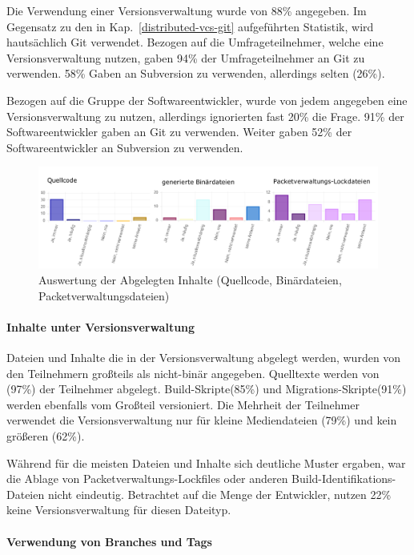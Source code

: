Die Verwendung einer Versionsverwaltung wurde von 88\% angegeben. Im Gegensatz zu den in  Kap.~\ref{distributed-vcs-git} aufgeführten Statistik, wird hautsächlich Git verwendet. Bezogen auf die Umfrageteilnehmer, welche eine Versionsverwaltung nutzen, gaben 94\% der Umfrageteilnehmer an Git zu verwenden. 58\% Gaben an Subversion zu verwenden, allerdings selten (26\%). 

Bezogen auf die Gruppe der Softwareentwickler, wurde von jedem angegeben eine Versionsverwaltung zu nutzen, allerdings ignorierten fast 20\% die Frage. 91\% der Softwareentwickler gaben an Git zu verwenden. Weiter gaben 52\% der Softwareentwickler an Subversion zu verwenden.

\begin{figure}[htbp]
  \includegraphics[width=\textwidth, height=\textheight, keepaspectratio]
    {resources/survey-vcs-content.pdf}
  \caption{Auswertung der Abgelegten Inhalte (Quellcode, Binärdateien, Packetverwaltungsdateien)}
\end{figure}

\paragraph{Inhalte unter Versionsverwaltung}

Dateien und Inhalte die in der Versionsverwaltung abgelegt werden, wurden von den Teilnehmern großteils als nicht-binär angegeben. Quelltexte werden von (97\%) der Teilnehmer abgelegt. Build-Skripte(85\%) und Migrations-Skripte(91\%) werden ebenfalls vom Großteil versioniert. Die Mehrheit der Teilnehmer verwendet die Versionsverwaltung nur für kleine Mediendateien (79\%) und kein größeren (62\%).

Während für die meisten Dateien und Inhalte sich deutliche Muster ergaben, war die Ablage von Packetverwaltungs-Lockfiles oder anderen Build-Identifikations-Dateien nicht eindeutig. Betrachtet auf die Menge der Entwickler, nutzen 22\% keine Versionsverwaltung für diesen Dateityp.

\paragraph{Verwendung von Branches und Tags}

